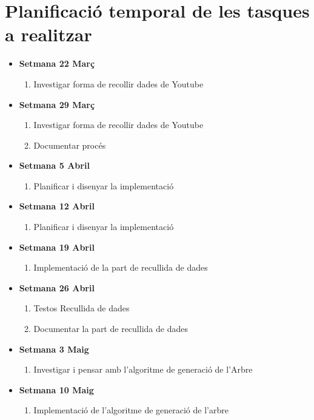 \documentclass{article}
\begin{document}
	\section{Planificació temporal de les tasques a realitzar}	
	\begin{itemize}
		\item \textbf{Setmana 22 Març}
		\begin{enumerate}
			\item Investigar forma de recollir dades de Youtube
		\end{enumerate}
		\item \textbf{Setmana 29 Març}
		\begin{enumerate}
			\item  Investigar forma de recollir dades de Youtube
			\item Documentar procés
		\end{enumerate}
		\item \textbf{Setmana 5 Abril}
		\begin{enumerate}
			\item Planificar i disenyar la implementació
		\end{enumerate}
		\item \textbf{Setmana 12 Abril}
		\begin{enumerate}
			\item Planificar i disenyar la implementació
		\end{enumerate}
		\item \textbf{Setmana 19 Abril}
		\begin{enumerate}
			\item Implementació de la part de recullida de dades
		\end{enumerate}
		\item \textbf{Setmana 26 Abril}
		\begin{enumerate}
			\item Testos Recullida de dades
			\item Documentar la part de recullida de dades
		\end{enumerate}
		\item \textbf{Setmana 3 Maig}
		\begin{enumerate}
			\item Investigar i pensar amb l'algoritme de generació de l'Arbre
		\end{enumerate}
		\item \textbf{Setmana 10 Maig}
		\begin{enumerate}
			\item Implementació de l'algoritme de generació de l'arbre

\end{enumerate}
\end{itemize}
\end{document}
